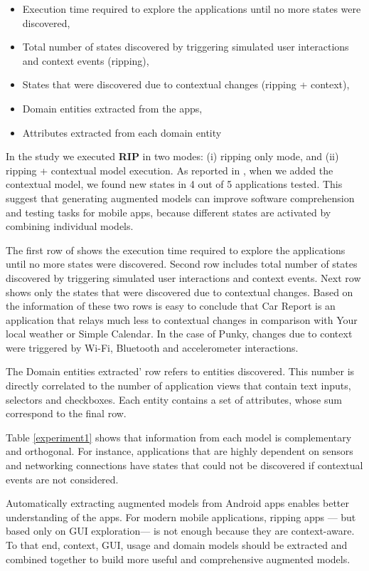\begin{itemize}
	\item  Execution time required to explore the applications until no more states were discovered,
	\item Total number of states discovered by triggering simulated user interactions and context events (ripping),
	\item States that were discovered due to contextual changes (ripping + context),
	\item Domain entities extracted from the apps,
	\item Attributes extracted from each domain entity
	
\end{itemize}

In the study we executed \textbf{RIP} in two modes: (i) ripping only mode, and (ii) ripping + contextual model execution. As reported in , when we added the contextual model,  we found new states in 4 out of 5 applications tested. This suggest that generating augmented models can improve software comprehension and  testing tasks for mobile apps, because different states are activated by combining individual models.

The first row of  shows the execution time required to explore the applications until no more states were discovered. Second row includes total number of states discovered by triggering simulated user interactions and context events. Next row shows only the states that were discovered due to contextual changes. Based on the information of these two rows is easy to conclude that Car Report is an application that relays much less to contextual changes in comparison with Your local weather or Simple Calendar. In the case of Punky, changes due to context were triggered by Wi-Fi, Bluetooth and accelerometer interactions.

The Domain entities extracted' row refers to entities discovered. This number is directly correlated to the number of application views that contain text inputs, selectors and checkboxes. Each entity contains a set of attributes, whose sum correspond to the final row. 

Table \ref{experiment1} shows that information from each model is complementary and orthogonal.  For instance, applications that are highly dependent on sensors and networking connections have states that could not be discovered if contextual events are not considered.

\begin{tcolorbox}[title= \textit{\textbf{RQ$_1$}} Is the combination of multiple models useful to gather more information of an app under test?]
	Automatically extracting augmented models from Android apps enables better understanding of the apps. For modern mobile applications, ripping apps --- but based only on GUI exploration--- is not enough because they are context-aware. To that end, context, GUI, usage and domain models should be extracted and combined together to build more useful and comprehensive augmented models. 
\end{tcolorbox}

